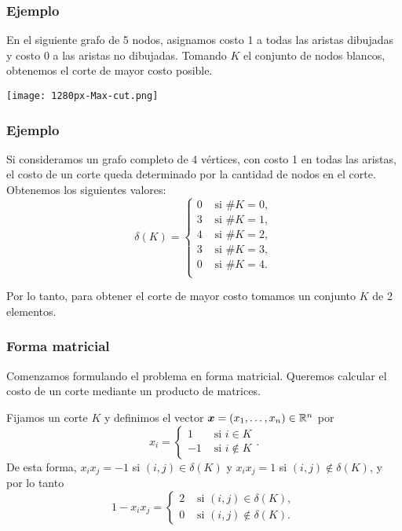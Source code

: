 \documentclass[aspectratio=169,12pt,spanish]{beamer}
\begin{document}

\begin{frame}
\frametitle{Ejemplo}

En el siguiente grafo de 5 nodos, asignamos costo 1 a todas las aristas dibujadas y costo 0 a las aristas no dibujadas. Tomando $K$ el conjunto de nodos blancos, obtenemos el corte de mayor costo posible.
\begin{center}
\texttt{[image: 1280px-Max-cut.png]}
\end{center}



\end{frame}


\begin{frame}
\frametitle{Ejemplo}

Si consideramos un grafo completo de 4 vértices, con costo 1 en todas las aristas, el costo de un corte queda determinado por la cantidad de nodos en el corte. Obtenemos los siguientes valores:
$$
\delta(K) = \begin{cases}
0 & \text{ si } \#K = 0, \\
3 & \text{ si } \#K = 1, \\
4 & \text{ si } \#K = 2, \\
3 & \text{ si } \#K = 3, \\
0 & \text{ si } \#K = 4. \\
\end{cases}
$$

Por lo tanto, para obtener el corte de mayor costo tomamos un conjunto $K$ de 2 elementos.

\end{frame}


\begin{frame}
\frametitle{Forma matricial}

Comenzamos formulando el problema en forma matricial. Queremos calcular el costo de un corte mediante un producto de matrices.

Fijamos un corte $K$ y definimos el vector $\bm{x} = (x_1, \dots, x_n) \in \mathbb{R}^n$ por
$$
x_i = \begin{cases}
1 & \text{ si } i \in K \\
-1 &  \text{ si } i \notin K
\end{cases}.
$$
De esta forma, $x_i x_j = -1$ si $(i,j) \in \delta(K)$ y $x_i x_j = 1$ si $(i,j) \notin \delta(K)$, y por lo tanto
$$
1 - x_i x_j = \begin{cases}
2 & \text{ si } (i,j) \in \delta(K), \\
0 &  \text{ si } (i,j) \notin \delta(K).
\end{cases}
$$


\end{frame}
\end{document}
